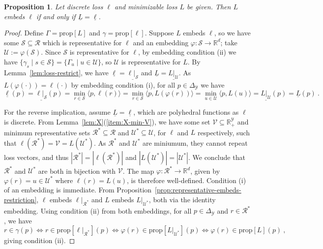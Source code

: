 \documentclass[11pt]{article}
\newcommand{\Comments}{1}
\newcommand{\mytodo}[2]{\ifnum\Comments=1%
  \todo[linecolor=#1!80!black,backgroundcolor=#1,bordercolor=#1!80!black]{#2}\fi}
\newcommand{\raft}[1]{\mytodo{green!20!white}{RF: #1}}
\newcommand{\jessiet}[1]{\mytodo{teal!20!white}{JF: #1}}
\newcommand{\reals}{\mathbb{R}}
\newcommand{\prop}[1]{\mathrm{prop}[#1]}
\newcommand{\simplex}{\Delta_\Y}
\newcommand{\R}{\mathcal{R}}
\newcommand{\Sc}{\mathcal{S}}
\newcommand{\U}{\mathcal{U}}
\newcommand{\V}{\mathcal{V}}
\newcommand{\Y}{\mathcal{Y}}
\newcommand{\risk}[1]{\underline{#1}}
\newcommand{\inprod}[2]{\langle #1, #2 \rangle}%
\newtheorem{proposition}{Proposition}
\begin{document}
\begin{proposition}\label{prop:embed-bayes-risks}
  Let discrete loss $\ell$ and minimizable loss $L$ be given.
  Then $L$ embeds $\ell$ if and only if $\risk{L}=\risk{\ell}$.
\end{proposition}
\begin{proof}
  Define $\Gamma = \prop{L}$ and $\gamma = \prop{\ell}$.
  Suppose $L$ embeds $\ell$, so we have some $\Sc\subseteq \R$ which is representative for $\ell$ and an embedding $\varphi:\Sc\to\reals^d$; take $\U := \varphi(\Sc)$.
  Since $\Sc$ is representative for $\ell$, by embedding condition (ii) we have $\{\gamma_s \mid s\in\Sc\} = \{\Gamma_u \mid u\in\U\}$, so $\U$ is representative for $L$.
  By Lemma~\ref{lem:loss-restrict}, we have $\risk{\ell} = \risk{\ell|_{\Sc}}$ and $\risk{L} = \risk{L|_{\U}}$.
  As $L(\varphi(\cdot)) = \ell(\cdot)$ by embedding condition (i), for all $p\in\simplex$ we have
  \begin{equation*}
    \risk{\ell}(p) = \risk{\ell|_\Sc}(p) = \min_{r \in \Sc}\inprod{p}{\ell(r)} = \min_{r \in \Sc}\inprod{p}{L(\varphi(r))} = \min_{u \in \U}\inprod{p}{L(u)} = \risk{L|_\U}(p) = \risk{L}(p)~.
  \end{equation*}
  
	For the reverse implication, assume $\risk{L} = \risk{\ell}$, which are polyhedral functions as $\ell$ is discrete.
  From Lemma~\ref{lem:X}(\ref{item:X-min-V}), we have some set $\V\subseteq\reals^\Y_+$ and minimum representative sets $\R^* \subseteq \R$ and $\U^* \subseteq \U$, for $\ell$ and $L$ respectively, such that $\ell(\R^*) = \V = L(\U^*)$.
  As $\R^*$ and $\U^*$ are miniumum, they cannot repeat loss vectors, and thus $|\R^*|=|\ell(\R^*)|$ and $|L(\U^*)|=|\U^*|$.
  We conclude that $\R^*$ and $\U^*$ are both in bijection with $\V$.
  The map $\varphi :\R^* \to \reals^d$, given by $\varphi(r) = u \in \U^*$ where $\ell(r) = L(u)$, is therefore well-defined.
  Condition (i) of an embedding is immediate.
  From Proposition~\ref{prop:representative-embeds-restriction}, $\ell$ embeds $\ell|_{\R^*}$ and $L$ embeds $L|_{\U^*}$, both via the identity embedding.
  Using condition (ii) from both embeddings, for all $p\in\simplex$ and $r\in\R^*$, we have
  \begin{equation*}
    r \in \gamma(p) \iff r \in \prop{\ell|_{\R^*}}(p) \iff \varphi(r) \in \prop{L|_{\U^*}}(p)
    \iff \varphi(r) \in \prop{L}(p)~,
  \end{equation*}
  giving condition (ii).
\end{proof}
\end{document}
